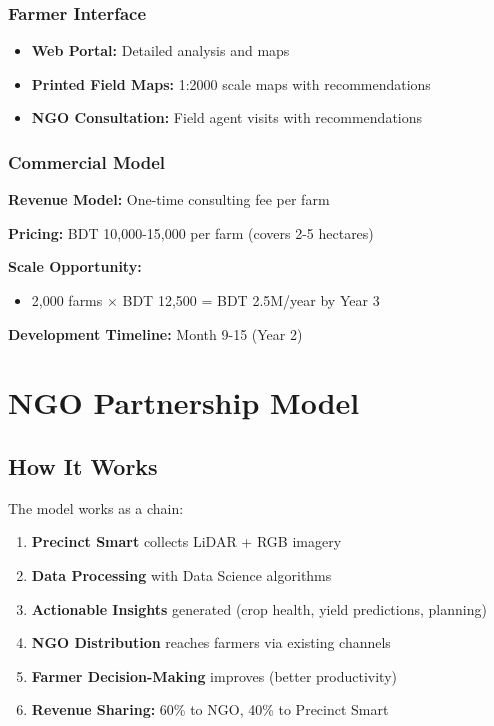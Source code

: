 \subsubsection{Farmer Interface}

\begin{itemize}
    \item \textbf{Web Portal:} Detailed analysis and maps
    \item \textbf{Printed Field Maps:} 1:2000 scale maps with recommendations
    \item \textbf{NGO Consultation:} Field agent visits with recommendations
\end{itemize}

\subsubsection{Commercial Model}

\textbf{Revenue Model:} One-time consulting fee per farm

\textbf{Pricing:} BDT 10,000-15,000 per farm (covers 2-5 hectares)

\textbf{Scale Opportunity:}
\begin{itemize}
    \item 2,000 farms × BDT 12,500 = BDT 2.5M/year by Year 3
\end{itemize}

\textbf{Development Timeline:} Month 9-15 (Year 2)

\section{NGO Partnership Model}

\subsection{How It Works}

The model works as a chain:

\begin{enumerate}
    \item \textbf{Precinct Smart} collects LiDAR + RGB imagery
    \item \textbf{Data Processing} with Data Science algorithms
    \item \textbf{Actionable Insights} generated (crop health, yield predictions, planning)
    \item \textbf{NGO Distribution} reaches farmers via existing channels
    \item \textbf{Farmer Decision-Making} improves (better productivity)
    \item \textbf{Revenue Sharing:} 60\% to NGO, 40\% to Precinct Smart
\end{enumerate}

